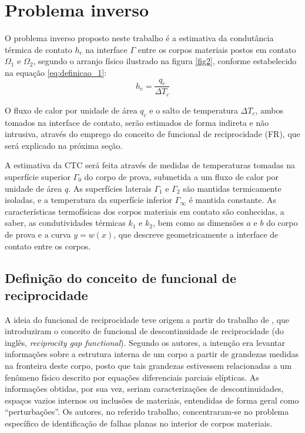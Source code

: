 \section{Problema inverso}\label{sec_prob_inv}

O problema inverso proposto neste trabalho é a estimativa da condutância térmica de contato $h_c$ na interface $\Gamma$ entre os corpos materiais
postos em contato $\Omega_1$ e $\Omega_2$, segundo o arranjo físico ilustrado na figura \ref{fig2}, conforme estabelecido na equação \eqref{eq:definicao_1}:
\begin{equation}
	h_c = \frac{q_c}{\Delta T_c}
\end{equation}

O fluxo de calor por unidade de área $q_c$ e o salto de temperatura $\Delta T_c$, ambos tomados na interface de contato, serão estimados de forma
indireta e não intrusiva, através do emprego do conceito de funcional de reciprocidade (FR), que será explicado na próxima seção.

A estimativa da CTC será feita através de medidas de temperaturas tomadas na superfície superior $\Gamma_0$ do corpo de prova, submetida a um fluxo
de calor por unidade de área $q$. As superfícies laterais $\Gamma_1$ e $\Gamma_2$ são mantidas termicamente isoladas, e a temperatura da superfície
inferior $\Gamma_\infty$ é mantida constante. As características termofísicas dos corpos materiais em contato são conhecidas, a saber, as 
condutividades térmicas $k_1$ e $k_2$, bem como as dimensões $a$ e $b$ do corpo de prova e a curva $y = w(x)$, que descreve geometricamente a interface
de contato entre os corpos. 

\subsection{Definição do conceito de funcional de reciprocidade}

A ideia do funcional de reciprocidade teve origem a partir do trabalho de \cite{artigo_andrieux}, que introduziram o conceito de funcional de descontinuidade
de reciprocidade (do inglês, \textit{reciprocity gap functional}). Segundo os autores, a intenção era levantar informações sobre a estrutura interna de
um corpo a partir de grandezas medidas na fronteira deste corpo, posto que tais grandezas estivessem relacionadas a um fenômeno físico descrito por
equações diferenciais parciais elípticas. As informações obtidas, por sua vez, seriam caracterizações de descontinuidades, espaços vazios internos ou inclusões
de materiais, entendidas de forma geral como ``perturbações''. Os autores, no referido trabalho, concentraram-se no problema específico de identificação
de falhas planas no interior de corpos materiais.

